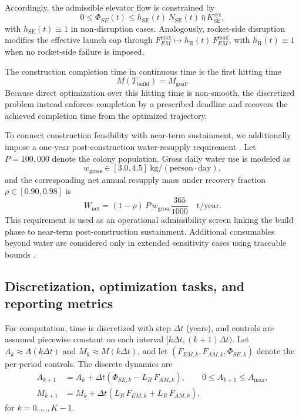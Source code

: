 \documentclass[12pt]{article}
\begin{document}
Accordingly, the admissible elevator flow is constrained by
\begin{equation}
	0\le \Phi_{SE}(t)\le h_{\mathrm{SE}}(t)\,N_{\mathrm{SE}}(t)\,\bar{\eta}\,K_{\mathrm{SE}}^{\mathrm{sys}},
	\label{eq:se_effective_methods}
\end{equation}
with $h_{\mathrm{SE}}(t)\equiv 1$ in non-disruption cases. Analogously, rocket-side disruption modifies the effective launch cap through $F_{EM}^{\max}\mapsto h_{\mathrm{R}}(t)\,F_{EM}^{\max}$, with $h_{\mathrm{R}}(t)\equiv 1$ when no rocket-side failure is imposed.

The construction completion time in continuous time is the first hitting time
\begin{equation}
	M(T_{\mathrm{build}})=M_{\mathrm{goal}}.
	\label{eq:build_target_methods}
\end{equation}
Because direct optimization over this hitting time is non-smooth, the discretized problem instead enforces completion by a prescribed deadline and recovers the achieved completion time from the optimized trajectory.

To connect construction feasibility with near-term sustainment, we additionally impose a one-year post-construction water-resupply requirement \cite{COMAP2026B}. Let $P = 100{,}000$ denote the colony population. Gross daily water use is modeled as
\begin{equation}
	w_{\mathrm{gross}} \in [3.0, 4.5]\ \mathrm{kg/(person\cdot day)},
	\label{eq:wgross_methods}
\end{equation}
and the corresponding net annual resupply mass under recovery fraction $\rho \in [0.90, 0.98]$ is
\begin{equation}
	W_{\mathrm{net}}
	= (1-\rho)\, P\, w_{\mathrm{gross}} \frac{365}{1000}
	\quad \text{t/year}.
	\label{eq:Wnet_methods}
\end{equation}
This requirement is used as an operational admissibility screen linking the build phase to near-term post-construction sustainment. Additional consumables beyond water are considered only in extended sensitivity cases using traceable bounds \cite{Ewert2022BVAD}.

\subsection{Discretization, optimization tasks, and reporting metrics}
\label{subsec:workflow}

For computation, time is discretized with step $\Delta t$ (years), and controls are assumed piecewise constant on each interval $[k\Delta t,(k+1)\Delta t)$. Let $A_k\approx A(k\Delta t)$ and $M_k\approx M(k\Delta t)$, and let $(F_{EM,k},F_{AM,k},\Phi_{SE,k})$ denote the per-period controls. The discrete dynamics are
\begin{align}
	A_{k+1}&=A_k+\Delta t\left(\Phi_{SE,k}-L_R\,F_{AM,k}\right),\qquad 0\le A_{k+1}\le A_{\max},
	\label{eq:disc_buffer_m3}\\
	M_{k+1}&=M_k+\Delta t\left(L_R\,F_{EM,k}+L_R\,F_{AM,k}\right),
	\label{eq:disc_mass_m3}
\end{align}
for $k=0,\ldots,K-1$.
\end{document}
